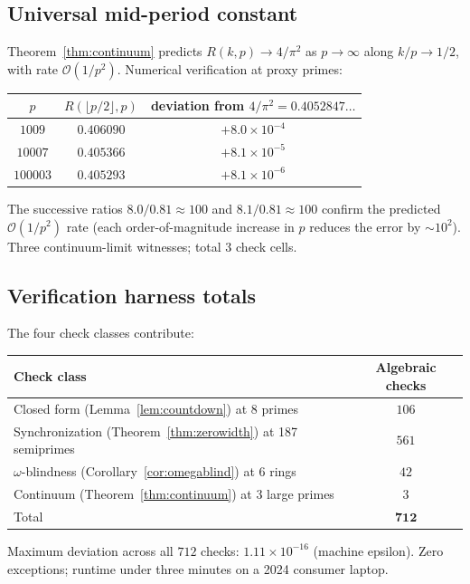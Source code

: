 \documentclass[11pt,reqno]{amsart}
\theoremstyle{plain}
\theoremstyle{definition}
\theoremstyle{remark}
\newcommand{\bigO}{\mathcal{O}}
\begin{document}
\subsection{Universal mid-period constant}

Theorem~\ref{thm:continuum} predicts $R(k, p) \to 4/\pi^2$ as
$p \to \infty$ along $k / p \to 1/2$, with rate $\bigO(1/p^2)$.
Numerical verification at proxy primes:
\begin{center}
\begin{tabular}{c|c|c}
\toprule
$p$   & $R(\lfloor p / 2 \rfloor, p)$ & deviation from $4/\pi^2 = 0.4052847\ldots$ \\
\midrule
$1009$    & $0.406090$ & $+8.0 \times 10^{-4}$ \\
$10007$   & $0.405366$ & $+8.1 \times 10^{-5}$ \\
$100003$  & $0.405293$ & $+8.1 \times 10^{-6}$ \\
\bottomrule
\end{tabular}
\end{center}
The successive ratios $8.0/0.81 \approx 100$ and $8.1/0.81
\approx 100$ confirm the predicted $\bigO(1/p^2)$ rate (each
order-of-magnitude increase in $p$ reduces the error by
$\sim 10^2$). Three continuum-limit witnesses; total $3$ check
cells.

\subsection{Verification harness totals}
\label{sec:verify-totals}

The four check classes contribute:
\begin{center}
\begin{tabular}{l|c}
\toprule
Check class & Algebraic checks \\
\midrule
Closed form (Lemma~\ref{lem:countdown}) at 8 primes
& $106$ \\
Synchronization (Theorem~\ref{thm:zerowidth}) at 187 semiprimes
& $561$ \\
$\omega$-blindness (Corollary~\ref{cor:omegablind}) at 6 rings
& $42$ \\
Continuum (Theorem~\ref{thm:continuum}) at 3 large primes
& $3$ \\
\midrule
Total
& $\mathbf{712}$ \\
\bottomrule
\end{tabular}
\end{center}
Maximum deviation across all $712$ checks: $1.11 \times 10^{-16}$
(machine epsilon). Zero exceptions; runtime under three minutes
on a 2024 consumer laptop.
\end{document}
